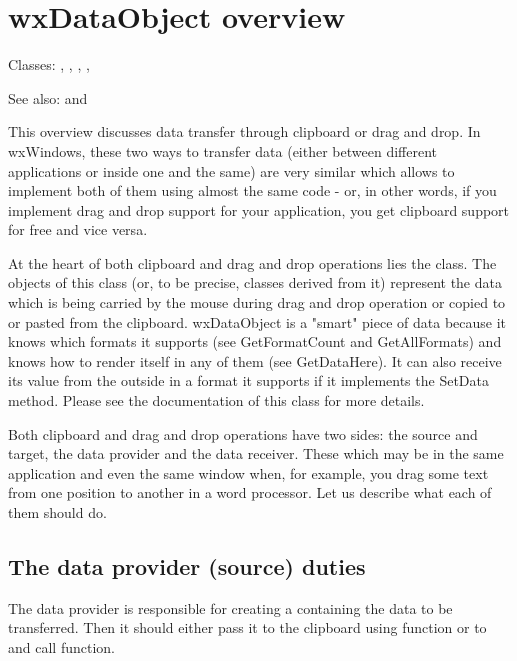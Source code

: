\section{wxDataObject overview}\label{wxdataobjectoverview}

Classes: ,
 ,
 ,
 ,

See also:  and 

This overview discusses data transfer through clipboard or drag and drop. In
wxWindows, these two ways to transfer data (either between different
applications or inside one and the same) are very similar which allows to
implement both of them using almost the same code - or, in other
words, if you implement drag and drop support for your application, you get
clipboard support for free and vice versa.

At the heart of both clipboard and drag and drop operations lies the 
 class. The objects of this class (or, to
be precise, classes derived from it) represent the data which is being carried
by the mouse during drag and drop operation or copied to or pasted from the
clipboard. wxDataObject is a "smart" piece of data because it knows which
formats it supports (see GetFormatCount and GetAllFormats) and knows how to
render itself in any of them (see GetDataHere). It can also receive its value
from the outside in a format it supports if it implements the SetData method.
Please see the documentation of this class for more details.

Both clipboard and drag and drop operations have two sides: the source and
target, the data provider and the data receiver. These which may be in the same
application and even the same window when, for example, you drag some text from
one position to another in a word processor. Let us describe what each of them
should do.

\subsection{The data provider (source) duties}\label{wxdataobjectsource}

The data provider is responsible for creating a 
 containing the data to be
transferred. Then it should either pass it to the clipboard using 
 function or to 
 and call 
 function.

